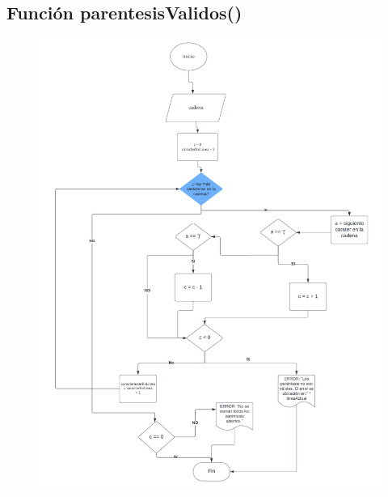 \documentclass{article}
\begin{document}
\pagebreak
\subsection{Función parentesisValidos()}
\begin{figure}[h] 
	\centering 	\includegraphics[width=0.94\linewidth]{Función parentesisValidos.png}
	\label{fig:Gráfica 3}
\end{figure}

\pagebreak
\end{document}
